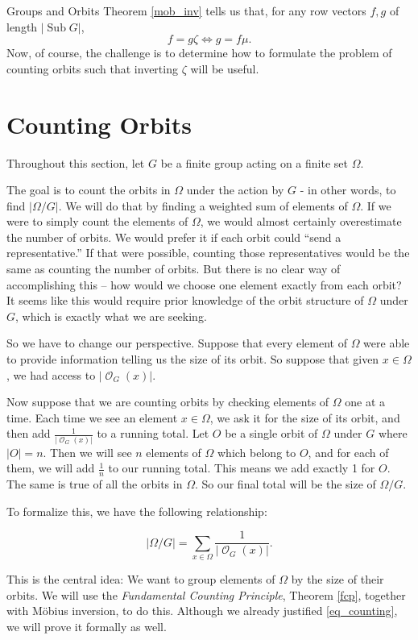 \documentclass[12pt]{pom_thesis}
\DeclareMathOperator{\sub}{Sub}
\DeclareMathOperator{\orb}{\mathcal{O}}
\begin{document}
\begin{chapter}{Groups and Orbits}
Theorem \ref{mob_inv} tells us that, for any row vectors $f,g$ of length $|\sub{G}|$, 
\[
f = g\zeta \iff g = f\mu.
\]
Now, of course, the challenge is to determine how to formulate the problem of counting orbits such that inverting $\zeta$ will be useful.
\section{Counting Orbits}
Throughout this section, let $G$ be a finite group acting on a finite set $\Omega$.

The goal is to count the orbits in $\Omega$ under the action by $G$ - in other words, to find $|\Omega/G|$. We will do that by finding a weighted sum of elements of $\Omega$. If we were to simply count the elements of $\Omega$, we would almost certainly overestimate the number of orbits. We would prefer it if each orbit could ``send a representative.'' If that were possible, counting those representatives would be the same as counting the number of orbits. But there is no clear way of accomplishing this -- how would we choose one element exactly from each orbit? It seems like this would require prior knowledge of the orbit structure of $\Omega$ under $G$, which is exactly what we are seeking.

So we have to change our perspective. Suppose that every element of $\Omega$ were able to provide information telling us the size of its orbit. So suppose that given $x \in \Omega$, we had access to $|\orb_G(x)|$. 

Now suppose that we are counting orbits by checking elements of $\Omega$ one at a time. Each time we see an element $x \in \Omega$, we ask it for the size of its orbit, and then add $\frac 1 {|\orb_G(x)|}$ to a running total. Let $O$ be a single orbit of $\Omega$ under $G$ where $|O|=n$. Then we will see $n$ elements of $\Omega$ which belong to $O$, and for each of them, we will add $\frac 1n$ to our running total. This means we add exactly 1 for $O$. The same is true of all the orbits in $\Omega$. So our final total will be the size of $\Omega/G$.

To formalize this, we have the following relationship:

\begin{equation}\label{eq_counting}
|\Omega/G| = \sum_{x \in \Omega}\frac 1 {|\orb_G(x)|}.
\end{equation}

This is the central idea: We want to group elements of $\Omega$ by the size of their orbits. We will use the \emph{Fundamental Counting Principle}, Theorem \ref{fcp}, together with M\"obius inversion, to do this. Although we already justified \eqref{eq_counting}, we will prove it formally as well.


\end{chapter}
\end{document}
